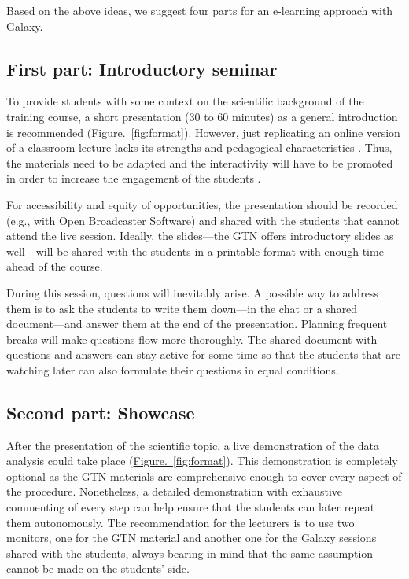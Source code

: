 Based on the above ideas, we suggest four parts for an e-learning approach with Galaxy.

\subsection*{First part: Introductory seminar}

To provide students with some context on the scientific background of the training course, a short presentation (30 to 60 minutes) as a general introduction is recommended (\hyperref[fig:format]{Figure.~\ref{fig:format}}). However, just replicating an online version of a classroom lecture lacks its strengths and pedagogical characteristics \cite{pratt2002lessons}. Thus, the materials need to be adapted and the interactivity will have to be promoted in order to increase the engagement of the students \cite{scagnoli2019students}.

For accessibility and equity of opportunities, the presentation should be recorded (e.g., with Open Broadcaster Software) and shared with the students that cannot attend the live session. Ideally, the slides—the GTN offers introductory slides as well—will be shared with the students in a printable format with enough time ahead of the course.

During this session, questions will inevitably arise. A possible way to address them is to ask the students to write them down—in the chat or a shared document—and answer them at the end of the presentation. Planning frequent breaks will make questions flow more thoroughly. The shared document with questions and answers can stay active for some time so that the students that are watching later can also formulate their questions in equal conditions.

\subsection*{Second part: Showcase}

After the presentation of the scientific topic, a live demonstration of the data analysis could take place (\hyperref[fig:format]{Figure.~\ref{fig:format}}). This demonstration is completely optional as the GTN materials are comprehensive enough to cover every aspect of the procedure. Nonetheless, a detailed demonstration with exhaustive commenting of every step can help ensure that the students can later repeat them autonomously. The recommendation for the lecturers is to use two monitors, one for the GTN material and another one for the Galaxy sessions shared with the students, always bearing in mind that the same assumption cannot be made on the students’ side.


